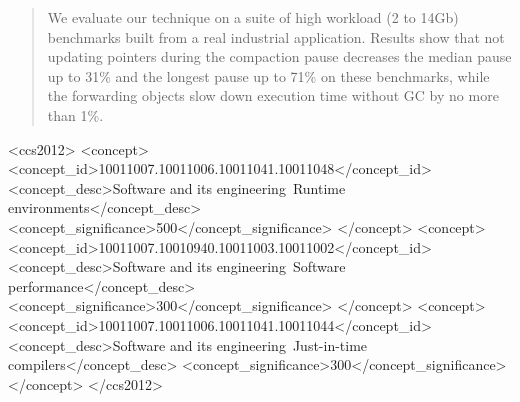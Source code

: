 \documentclass[sigplan,10pt,review,anonymous]{acmart}\settopmatter{printfolios=true,printccs=false,printacmref=false}
\def\bestMedian{31\%\xspace}
\def\bestWorst{71\%\xspace}
\begin{document}
\begin{abstract}
We evaluate our technique on a suite of high workload (2 to 14Gb) benchmarks built from a real industrial application. Results show that not updating pointers during the compaction pause decreases the median pause up to \bestMedian and the longest pause up to \bestWorst on these benchmarks, while the forwarding objects slow down execution time without GC by no more than 1\%.

\end{abstract}


\begin{CCSXML}
<ccs2012>
<concept>
<concept_id>10011007.10011006.10011041.10011048</concept_id>
<concept_desc>Software and its engineering~Runtime environments</concept_desc>
<concept_significance>500</concept_significance>
</concept>
<concept>
<concept_id>10011007.10010940.10011003.10011002</concept_id>
<concept_desc>Software and its engineering~Software performance</concept_desc>
<concept_significance>300</concept_significance>
</concept>
<concept>
<concept_id>10011007.10011006.10011041.10011044</concept_id>
<concept_desc>Software and its engineering~Just-in-time compilers</concept_desc>
<concept_significance>300</concept_significance>
</concept>
</ccs2012>
\end{CCSXML}





\maketitle
\end{document}

